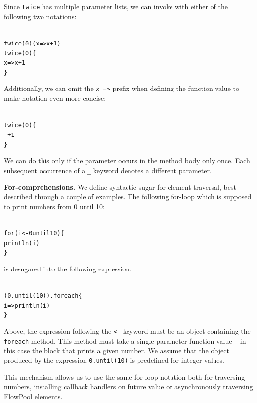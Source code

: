 \documentclass[runningheads,a4paper]{llncs}
\begin{document}
Since \verb=twice= has multiple parameter lists, we can invoke with either of the
following two notations:

\begin{minipage}[b]{3.75 cm}
\begin{alltt}
{\scriptsize
twice(0)(x => x + 1)
twice(0) \{
  x => x + 1
\}
}
\end{alltt}
\end{minipage}

Additionally, we can omit the \verb+x =>+ prefix when defining the function value to
make notation even more concise:

\begin{minipage}[b]{3.75 cm}
\begin{alltt}
{\scriptsize
twice(0) \{
  _ + 1
\}
}
\end{alltt}
\end{minipage}

We can do this only if the parameter occurs in the method body only once. Each subsequent
occurrence of a \verb=_= keyword denotes a different parameter.


\textbf{For-comprehensions.}
We define syntactic sugar for element traversal, best described through a couple of
examples.
The following for-loop which is supposed to print numbers from 0 until 10:

\begin{minipage}[b]{3.75 cm}
\begin{alltt}
{\scriptsize
for (i <- 0 until 10) \{
  println(i)
\}
}
\end{alltt}
\end{minipage}

is desugared into the following expression:

\begin{minipage}[b]{3.75 cm}
\begin{alltt}
{\scriptsize
(0.until(10)).foreach \{
  i => println(i)
\}
}
\end{alltt}
\end{minipage}

Above, the expression following the \verb=<-= keyword must be an object containing
the \verb=foreach= method.
This method must take a single parameter function value -- in this case the block
that prints a given number.
We assume that the object produced by the expression \verb=0.until(10)= is
predefined for integer values.

This mechanism allows us to use the same for-loop notation both for traversing
numbers, installing callback handlers on future value or asynchronously traversing
FlowPool elements.
\end{document}
